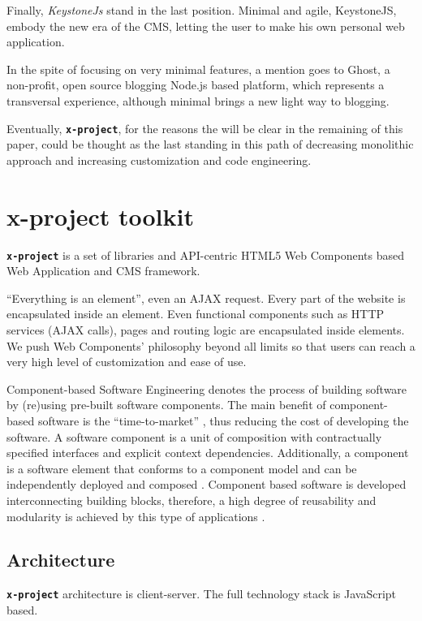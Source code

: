 \documentclass{sig-alternate}
\newcommand{\brand}[1]{\textbf{\tt #1}}
\begin{document}
Finally, \emph{KeystoneJs} stand in the last position. Minimal and agile, KeystoneJS, embody the new era of the CMS, letting the user to make his own personal web application.

In the spite of focusing on very minimal features, a mention goes to Ghost, a non-profit, open source blogging Node.js based platform, which represents a transversal experience, although minimal brings a new light way to blogging.

Eventually, \brand{x-project}, for the reasons the will be clear in the remaining of this paper, could be thought as the last standing in this path of decreasing monolithic approach and increasing customization and code engineering.



\section{x-project toolkit}
\brand{x-project} is a set of libraries and API-centric HTML5 Web Components based Web Application and CMS framework.



``Everything is an element'', even an AJAX request. Every part of the website is encapsulated inside an element. Even functional components such as HTTP services (AJAX calls), pages and routing logic are encapsulated inside elements. We push Web Components' philosophy beyond all limits so that users can reach a very high level of customization and ease of use.

Component-based Software Engineering denotes the process of building software by (re)using pre-built software components. The main benefit of component-based software is the ``time-to-market'' \cite{4773208}, thus reducing the cost of developing the software. A software component is a unit of composition with contractually specified interfaces and explicit context dependencies. 
Additionally, a component is a software element that conforms to a component model and can be independently deployed and composed \cite{Heineman:2001:CSE:379381}. 
Component based software is developed interconnecting building blocks, therefore, a high degree of reusability and modularity is achieved by this type of applications \cite{914739}. 



\subsection{Architecture}
\brand{x-project} architecture is client-server.
The full technology stack is JavaScript based.
\end{document}
